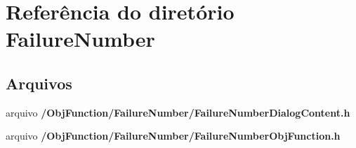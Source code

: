 \section{Referência do diretório Failure\+Number}
\label{dir_9c2ace82db16d6ec2602cc34c171d4f6}
\subsection*{Arquivos}
\begin{DoxyCompactItemize}
\item 
arquivo {\bf /\+Obj\+Function/\+Failure\+Number/\+Failure\+Number\+Dialog\+Content.\+h}
\item 
arquivo {\bf /\+Obj\+Function/\+Failure\+Number/\+Failure\+Number\+Obj\+Function.\+h}
\end{DoxyCompactItemize}
